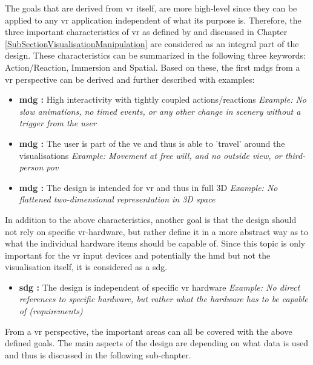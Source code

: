 The goals that are derived from \gls{vr} itself, are more high-level since they can be applied to any \gls{vr} application independent of what its purpose is. Therefore, the three important characteristics of \gls{vr} as defined by \cite{Stone1994} and discussed in Chapter \ref{SubSectionVisualisationManipulation} are considered as an integral part of the design. These characteristics can be summarized in the following three keywords: Action/Reaction, Immersion and Spatial. Based on these, the first \glspl{mdg} from a \gls{vr} perspective can be derived and further described with examples:
\begin{itemize}[noitemsep,nolistsep]
	\item \textbf{\gls{mdg} :} High interactivity with tightly coupled actions/reactions \newline
		\textit{Example: No slow animations, no timed events, or any other change in scenery without a trigger from the user}
	\item \textbf{\gls{mdg} :} The user is part of the \gls{ve} and thus is able to 'travel' around the visualisations \newline
		\textit{Example: Movement at free will, and no outside view, or third-person \gls{pov}}
	\item \textbf{\gls{mdg} :} The design is intended for \gls{vr} and thus in full 3D \newline
		\textit{Example: No flattened two-dimensional representation in 3D space}
\end{itemize}
In addition to the above characteristics, another goal is that the design should not rely on specific \gls{vr}-hardware, but rather define it in a more abstract way as to what the individual hardware items should be capable of. Since this topic is only important for the \gls{vr} input devices and potentially the \gls{hmd} but not the visualisation itself, it is considered as a \gls{sdg}.
\begin{itemize}[noitemsep,nolistsep]
	\item \textbf{\gls{sdg} :} The design is independent of specific \gls{vr} hardware \newline
		\textit{Example: No direct references to specific hardware, but rather what the hardware has to be capable of (requirements)}
\end{itemize}
From a \gls{vr} perspective, the important areas can all be covered with the above defined goals. The main aspects of the design are depending on what data is used and thus is discussed in the following sub-chapter.


